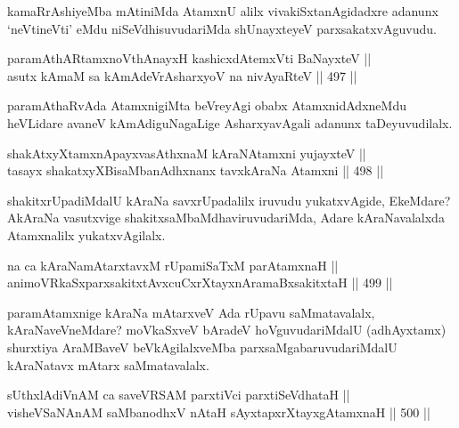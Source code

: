 \begin{artha}
kamaRrAshiyeMba mAtiniMda AtamxnU alilx vivakiSxtanAgidadxre adanunx
`neVtineVti' eMdu niSeVdhisuvudariMda shUnayxteyeV parxsakatxvAguvudu.
\end{artha}


\begin{shl}
paramAthARtamxnoV\s thAnayxH kashicxdAtemxVti BaNayxteV || \\
asutx kAmaM sa kAmAdeVrAsharxyoV na nivAyaRteV \hfill || 497 ||  
\end{shl}

\begin{artha}
paramAthaRvAda AtamxnigiMta beVreyAgi obabx AtamxnidAdxneMdu heVLidare
avaneV kAmAdiguNagaLige AsharxyavAgali adanunx taDeyuvudilalx.
\end{artha}

\begin{shl}
shakAtxyXtamxnA\s payxvasAthxnaM kAraNAtamxni yujayxteV || \\
tasayx shakatxyXBisaMbanAdhxnanx tavxkAraNa Atamxni \hfill || 498 ||  
\end{shl}

\begin{artha}
shakitxrUpadiMdalU kAraNa savxrUpadalilx iruvudu yukatxvAgide,
EkeMdare? AkAraNa vasutxvige shakitxsaMbaMdhaviruvudariMda, Adare
kAraNavalalxda Atamxnalilx yukatxvAgilalx.
\end{artha}

\begin{shl}
na ca kAraNamAtarxtavxM rUpamiSaTxM parAtamxnaH || \\
animoVRkaSxparxsakitxtAvxcuCxrXtayxnAramaBxsakitxtaH \hfill || 499 ||  
\end{shl}

\begin{artha}
paramAtamxnige kAraNa mAtarxveV Ada rUpavu saMmatavalalx,
kAraNaveVneMdare? moVkaSxveV bAradeV hoVguvudariMdalU (adhAyxtamx)
shurxtiya AraMBaveV beVkAgilalxveMba parxsaMgabaruvudariMdalU\break
kAraNatavx mAtarx saMmatavalalx.
\end{artha}


\begin{shl}
sUthxlAdiVnAM ca saveVRSAM parxtiVci parxtiSeVdhataH || \\
visheVSaNAnAM saMbanodhxV nAtaH sAyxtapxrXtayxgAtamxnaH \hfill || 500 ||  
\end{shl}

